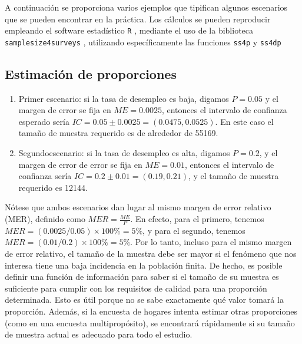 \documentclass[
  12pt,
  spanish,
]{book}
\begin{document}
A continuación se proporciona varios ejemplos que tipifican algunos escenarios que se pueden encontrar en la práctica. Los cálculos se pueden reproducir empleando el software estadístico \texttt{R} \citep{R2020}, mediante el uso de la biblioteca \texttt{samplesize4surveys} \citep{ss4s}, utilizando específicamente las funciones \texttt{ss4p} y \texttt{ss4dp}

\hypertarget{estimaciuxf3n-de-proporciones}{%
\subsection*{Estimación de proporciones}\label{estimaciuxf3n-de-proporciones}}

\begin{enumerate}
\def\labelenumi{\arabic{enumi}.}
\item
  Primer escenario: si la tasa de desempleo es baja, digamos \({P}=0.05\) y el margen de error se fija en \(ME = 0.0025\), entonces el intervalo de confianza esperado sería \(IC=0.05\pm0.0025=(0.0475,0.0525)\). En este caso el tamaño de muestra requerido es de alrededor de 55169.
\item
  Segundoescenario: si la tasa de desempleo es alta, digamos \({P}=0.2\), y el margen de error de error se fija en \(ME = 0.01\), entonces el intervalo de confianza sería \(IC=0.2\pm0.01=(0.19,0.21)\), y el tamaño de muestra requerido es 12144.
\end{enumerate}

Nótese que ambos escenarios dan lugar al mismo margen de error relativo (MER), definido como \(MER=\frac{ME}{{P}}\). En efecto, para el primero, tenemos \(MER=(0.0025/0.05)\times 100\%=5\%\), y para el segundo, tenemos \(MER=(0.01/0.2)\times 100\%=5\%\). Por lo tanto, incluso para el mismo margen de error relativo, el tamaño de la muestra debe ser mayor si el fenómeno que nos interesa tiene una baja incidencia en la población finita. De hecho, es posible definir una función de información para saber si el tamaño de su muestra es suficiente para cumplir con los requisitos de calidad para una proporción determinada. Esto es útil porque no se sabe exactamente qué valor tomará la proporción. Además, si la encuesta de hogares intenta estimar otras proporciones (como en una encuesta multipropósito), se encontrará rápidamente si su tamaño de muestra actual es adecuado para todo el estudio.
\end{document}
